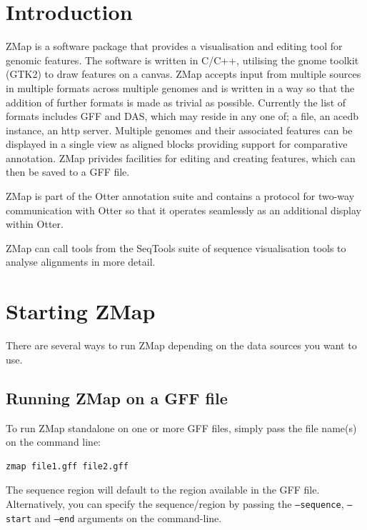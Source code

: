 \documentclass[letterpaper]{article}
\begin{document}
\setcounter{tocdepth}{10}
\renewcommand\contentsname{Contents}

\clearpage\tableofcontents

\clearpage
\section{Introduction}

ZMap is a software package that provides a visualisation and editing tool for genomic features. The software is written in C/C++, utilising the gnome toolkit (GTK2) to draw features on a canvas. ZMap accepts input from multiple sources in multiple formats across multiple genomes and is written in a way so that the addition of further formats is made as trivial as possible. Currently the list of formats includes GFF and DAS, which may reside in any one of; a file, an acedb instance, an http server. Multiple genomes and their associated features can be displayed in a single view as aligned blocks providing support for comparative annotation. ZMap privides facilities for editing and creating features, which can then be saved to a GFF file.

ZMap is part of the Otter annotation suite and contains a protocol for two-way communication with Otter so that it operates seamlessly as an additional display within Otter.

ZMap can call tools from the SeqTools suite of sequence visualisation tools to analyse alignments in more detail.

\section{Starting ZMap}
There are several ways to run ZMap depending on the data sources you want to use.

\subsection{Running ZMap on a GFF file}
To run ZMap standalone on one or more GFF files, simply pass the file name(s) on the command line:
\begin{verbatim}
zmap file1.gff file2.gff
\end{verbatim}

The sequence region will default to the region available in the GFF file. Alternatively, you can specify the sequence/region by passing the \texttt{--sequence}, \texttt{--start} and \texttt{--end} arguments on the command-line.
\end{document}
